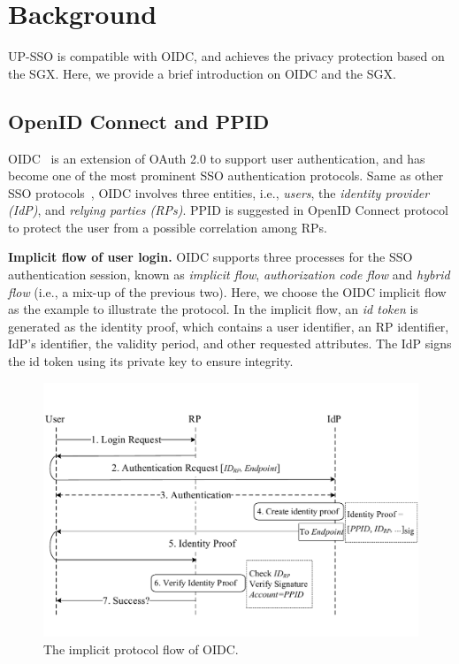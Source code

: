 \section{Background}
\label{sec:background}
UP-SSO is compatible with OIDC, and achieves the privacy protection based on the SGX.
Here, we provide a brief introduction on OIDC and the SGX.
\subsection{OpenID Connect and PPID}
OIDC~\cite{OpenIDConnect} is an extension of OAuth 2.0 to support user authentication, and has become one of the most prominent SSO authentication protocols. 
Same as other SSO protocols~\cite{SAMLIdentifier}, OIDC involves three entities, i.e., {\em users}, the {\em identity provider (IdP)}, and {\em relying parties (RPs)}.
PPID is suggested in OpenID Connect protocol to protect the user from a possible correlation among RPs.

\vspace{3mm}\noindent\textbf{Implicit flow of user login.}
OIDC supports three processes for the SSO authentication session, known as {\em implicit flow}, {\em authorization code flow} and {\em hybrid flow} (i.e., a mix-up of the previous two). Here, we choose the OIDC implicit flow as the example to illustrate the protocol. 
In the implicit flow, an {\em id token} is generated as the identity proof, which contains a user identifier, an RP identifier, IdP's identifier, the validity period, and other requested attributes.
The IdP signs the id token using its private key to ensure integrity.

\begin{figure}[t]
  \centering
  \includegraphics[width=\linewidth]{fig/OIDC1.pdf}
  \caption{The implicit protocol flow of OIDC.}
  \label{fig:OpenID}
\end{figure}

